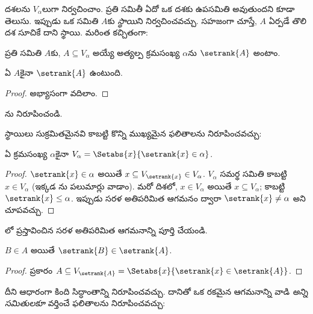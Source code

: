 \documentclass[../../../include/open-logic-section]{subfiles}
\begin{document}

దశలను $V_\alpha$లుగా నిర్వచించాం. ప్రతి సమితీ ఏదో ఒక
దశకు ఉపసమితి అవుతుందని కూడా తెలుసు. ఇప్పుడు ఒక సమితి
$A$కు \emph{స్థాయి}ని నిర్వచించవచ్చు. సహజంగా చూస్తే,
$A$ ఏర్పడే తొలి దశ సూచికే దాని స్థాయి.
మరింత కచ్చితంగా:

\begin{defn}
ప్రతి సమితి $A$కు, $A \subseteq V_\alpha$ అయ్యే అత్యల్ప క్రమసంఖ్య $\alpha$ను $\setrank{A}$ అంటాం.
\end{defn}
\begin{prop}
	ఏ $A$కైనా $\setrank{A}$ ఉంటుంది.
\end{prop}
\begin{proof}
	అభ్యాసంగా వదిలాం.
\end{proof}
\begin{prob}
	ను నిరూపించండి.
\end{prob}
\noindent
స్థాయిలు సుక్రమితమైనవి కాబట్టి కొన్ని ముఖ్యమైన
ఫలితాలను నిరూపించవచ్చు:
\begin{prop}
ఏ క్రమసంఖ్య $\alpha$కైనా $V_\alpha = \Setabs{x}{\setrank{x} \in \alpha}$.
\end{prop}

\begin{proof}
$\setrank{x} \in \alpha$ అయితే $x \subseteq V_{\setrank{x}} \in
V_\alpha$. $V_\alpha$ సమర్థ సమితి కాబట్టి $x \in V_\alpha$
(ఇక్కడ ను పలుమార్లు వాడాం).
మరో దిశలో, $x \in V_\alpha$ అయితే $x \subseteq V_\alpha$; కాబట్టి $\setrank{x} \leq \alpha$. ఇప్పుడు సరళ అతిపరిమిత ఆగమనం ద్వారా $\setrank{x} \neq \alpha$ అని చూపవచ్చు.
\end{proof}
\begin{prob}
	లో ప్రస్తావించిన సరళ అతిపరిమిత ఆగమనాన్ని పూర్తి చేయండి.
\end{prob}

\begin{prop}
$B \in A$ అయితే $\setrank{B} \in \setrank{A}$.
\end{prop}

\begin{proof}
 ప్రకారం $A \subseteq V_{\setrank{A}} = \Setabs{x}{\setrank{x} \in
\setrank{A}}$.
\end{proof}
\noindent
దీని ఆధారంగా కింది సిద్ధాంతాన్ని నిరూపించవచ్చు.
దానితో ఒక రకమైన ఆగమనాన్ని వాడి \emph{అన్ని సమితులకూ}
వర్తించే ఫలితాలను నిరూపించవచ్చు:
\end{document}
